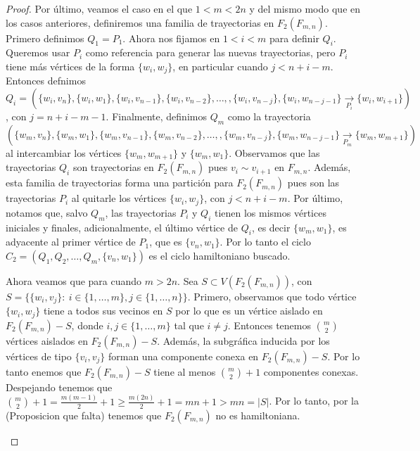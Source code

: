 \begin{proof}
    Por \'ultimo, veamos el caso en el que $1<m<2n$ y del mismo modo que en los
    casos anteriores, definiremos una familia de trayectorias en $F_2(F_{m,n})$.
    Primero definimos $Q_1 =P_1$. Ahora nos fijamos en $1<i<m$ para definir
    $Q_i$. Queremos usar $P_i$ como referencia para generar las nuevas
    trayectorias, pero $P_i$ tiene m\'as v\'ertices de la forma $\{w_i,w_j\}$,
    en particular cuando $j< n+i-m$. Entonces defnimos $Q_i =
    (\{w_i,v_n\},\{w_i,w_1\},\{w_i,v_{n-1}\},\{w_i,v_{n-2}\}, \dots,
    ,\{w_i,v_{n-j}\},\{w_i,w_{n-j-1}\}\xrightarrow[P_i]{}\{w_i,w_{i+1}\})$, con
    $j = n+i-m-1$. Finalmente, definimos $Q_m$ como la trayectoria
    $(\{w_m,v_n\},\{w_m,w_1\},\{w_m,v_{n-1}\},\{w_m,v_{n-2}\}, \dots,
    ,\{w_m,v_{n-j}\},\{w_m,w_{n-j-1}\}\xrightarrow[P_m]{}\{w_m,w_{m+1}\})$ al
    intercambiar los v\'ertices $\{w_m,w_{m+1}\}$ y $\{w_m,w_1\}$. Observamos
    que las trayectorias $Q_i$ son trayectorias en $F_2(F_{m,n})$ pues $v_i \sim
    v_{i+1}$ en $F_{m,n}$. Adem\'as, esta familia de trayectorias forma una
    partici\'on para $F_2(F_{m,n})$ pues son las trayectorias $P_i$ al quitarle
    los v\'ertices $\{w_i,w_j\}$, con $j< n+i-m$. Por \'ultimo, notamos que,
    salvo $Q_m$, las trayectorias $P_i$ y $Q_i$ tienen los mismos v\'ertices
    iniciales y finales, adicionalmente, el \'ultimo v\'ertice de $Q_i$, es
    decir $\{w_m,w_1\}$, es adyacente al primer v\'ertice de $P_1$, que es
    $\{v_n,w_1\}$. Por lo tanto el ciclo $C_2=(Q_1,Q_2, \dots, Q_m,
    \{v_n,w_1\})$ es el ciclo hamiltoniano buscado.

    Ahora veamos que para cuando $m>2n$. Sea $S \subset V(F_2(F_{m,n}))$, con
    $S=\{\{w_i,v_j\} \colon\ i \in \{1,\dots,m\},j\in\{1,\dots,n\}\}$. Primero,
    observamos que todo v\'ertice $\{w_i,w_j\}$ tiene a todos sus vecinos en $S$
    por lo que es un v\'ertice aislado en $F_2(F_{m,n})-S$, donde $i,j \in
    \{1,\dots,m\}$ tal que $i \neq j$. Entonces tenemos $\binom{m}{2}$
    v\'ertices aislados en $F_2(F_{m,n})-S$. Adem\'as, la subgr\'afica inducida
    por los v\'ertices de tipo $\{v_i,v_j\}$ forman una componente conexa en
    $F_2(F_{m,n})-S$. Por lo tanto enemos que $F_2(F_{m,n})-S$ tiene al menos
    $\binom{m}{2} + 1$ componentes conexas. Despejando tenemos que $\binom{m}{2}
    + 1 = \frac{m(m-1)}{2} + 1 \geq \frac{m(2n)}{2} + 1 = mn + 1 > mn = |S|$.
    Por lo tanto, por la (Proposicion que falta) tenemos que $F_2(F_{m,n})$ no
    es hamiltoniana.

    \begin{figure}[ht!]
        \centering
           \begin{tikzpicture}


\end{tikzpicture}
\end{figure}
\end{proof}
